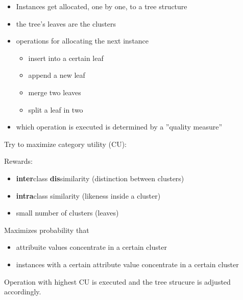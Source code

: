 \begin{breakbox}

\begin{itemize}
	\item Instances get allocated, one by one, to a tree structure
	\item the tree's leaves are the clusters
	\item operations for allocating the next instance
		\begin{itemize}
			\item insert into a certain leaf
			\item append a new leaf
			\item merge two leaves
			\item split a leaf in two
		\end{itemize}
	\item which operation is executed is determined by a ''quality measure''
\end{itemize}

Try to maximize category utility (CU):

Rewards:
\begin{itemize}
	\item \textbf{inter}class \textbf{dis}similarity (distinction between clusters)
	\item \textbf{intra}class similarity (likeness inside a cluster)
	\item small number of clusters (leaves)
\end{itemize}

Maximizes probability that
\begin{itemize}
	\item attribuite values concentrate in a certain cluster
	\item instances with a certain attribute value concentrate in a certain cluster
\end{itemize}

Operation with highest CU is executed and the tree strucure is adjusted accordingly.

\end{breakbox}



